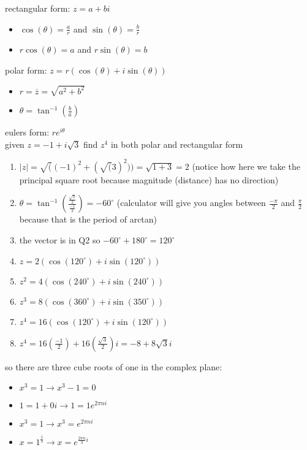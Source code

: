 \documentclass{article}
\begin{document}
rectangular form: $z = a + bi$\\
	\begin{itemize}
		\item $\cos(\theta) = \frac{a}{r}$ and $\sin(\theta) = \frac{b}{r}$
		\item $r\cos(\theta) = a$ and $r\sin(\theta) = b$
	\end{itemize}
polar form: $z = r(\cos(\theta) + i\sin(\theta))$
	\begin{itemize}
		\item $r = \overline{z} = \sqrt{a^2 + b^2}$
		\item $\theta = \tan^{-1}(\frac{b}{a})$
	\end{itemize}
eulers form: $re^{i\theta}$\\

given $z = -1 + i\sqrt{3}$ find $z^4$ in both polar and rectangular form
	\begin{enumerate}
		\item $\lvert z\rvert = \sqrt((-1)^2 + (\sqrt(3)^2)) = \sqrt{1 + 3} = 2$ (notice how here we take the principal square root because magnitude (distance) has no direction)
		\item $\theta = \tan^{-1}(\frac{\frac{\sqrt{3}}{2}}{\frac{-1}{2}}) = -60^{\circ}$ (calculator will give you angles between $\frac{-\pi}{2}$ and $\frac{\pi}{2}$ because that is the period of arctan)
		\item the vector is in Q2 so $-60^{\circ} + 180^{\circ} = 120^{\circ}$
		\item $z = 2(\cos(120^{\circ}) + i\sin(120^{\circ}))$
		\item $z^2 = 4(\cos(240^{\circ}) + i\sin(240^{\circ}))$		
		\item $z^3 = 8(\cos(360^{\circ}) + i\sin(350^{\circ}))$
		\item $z^4 = 16(\cos(120^{\circ}) + i\sin(120^{\circ}))$
		\item $z^4 = 16(\frac{-1}{2}) + 16(\frac{\sqrt{3}}{2})i = -8 + 8\sqrt{3}i$
	\end{enumerate}

so there are three cube roots of one in the complex plane:\\
	\begin{itemize}
		\item $x^3 = 1 \to x^3 - 1 = 0$ 
		\item $1 = 1 + 0i \to 1 = 1e^{2\pi ni}$
		\item $x^3 = 1 \to x^3 = e^{2\pi ni}$
		\item $x = 1^{\frac{1}{3}} \to x = e^{\frac{2\pi n}{3}i}$
	\end{itemize}
\end{document}
